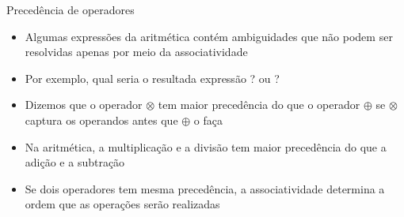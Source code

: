 \begin{frame}[fragile]{Precedência de operadores}

    \begin{itemize}
        \item Algumas expressões da aritmética contém ambiguidades que não podem ser resolvidas apenas por meio da associatividade
        \pause

        \item Por exemplo, qual seria o resultada expressão ?  ou ?
        \pause

        \item Dizemos que o operador $\otimes$ tem maior precedência do que o operador $\oplus$ se $\otimes$ captura os operandos antes que $\oplus$ o faça
        \pause

        \item Na aritmética, a multiplicação e a divisão tem maior precedência do que a adição e a subtração
        \pause

        \item Se dois operadores tem mesma precedência, a associatividade determina a ordem que as operações serão realizadas
    \end{itemize}

\end{frame}

